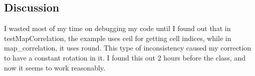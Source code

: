 \documentclass[twoside]{article}
\begin{document}
\begin{multicols}{2}
\section{Discussion}
I wasted most of my time on debugging my code until I found out that in testMapCorrelation,
the example uses ceil for getting cell indices, while in map\_correlation, it uses round.
This type of inconsistency caused my correction to have a constant rotation in it. I found this
out 2 hours before the class, and now it seems to work reasonably.

%
%
%
%


\end{multicols}
\end{document}
